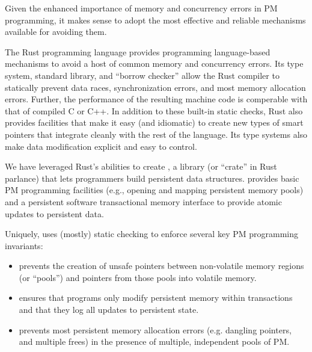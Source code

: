 
Given the enhanced importance of memory and concurrency errors in PM
programming, it makes sense to adopt the most effective and reliable mechanisms
available for avoiding them.

The Rust programming language provides programming language-based mechanisms to
avoid a host of common memory and concurrency errors.  Its type system,
standard library, and ``borrow checker'' allow the Rust compiler to statically
prevent data races, synchronization errors, and most memory
allocation errors.  Further, the performance of the resulting machine code is
comperable with that of compiled C or C++.  In addition to these built-in
static checks, Rust also provides facilities that make it easy (and idiomatic)
to create new types of smart pointers that integrate cleanly with the rest of
the language.  Its type systems also make data modification explicit and easy to control.

We have leveraged Rust's abilities to create \this{}, a library (or ``crate''
in Rust parlance) that lets programmers build persistent data structures.
\This{} provides basic PM programming facilities (e.g., opening and mapping
persistent memory pools) and a persistent software transactional memory
interface to provide atomic updates to persistent data.

Uniquely, \this{} uses (mostly) static checking to enforce several key PM
programming invariants:

\begin{itemize}
 
\item \This{} prevents the creation of unsafe pointers between non-volatile memory regions (or ``pools'') and pointers from those pools into volatile memory.
  
\item \This{} ensures that programs only modify persistent memory within transactions and that they log all updates to persistent state.
  
\item \This{} prevents most persistent memory allocation errors (e.g. dangling pointers, and multiple frees) in the presence of multiple, independent pools of PM.
  

\end{itemize}

